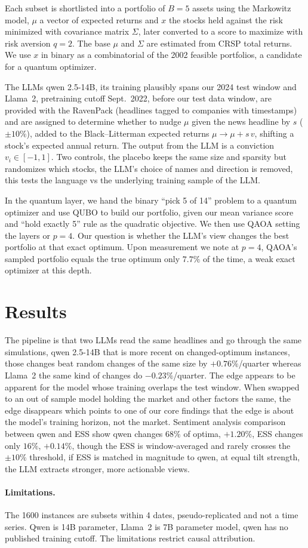 \documentclass[runningheads]{llncs}
\begin{document}
Each subset is shortlisted into a portfolio of $B=5$ assets using the Markowitz
model, $\mu$ a vector of expected returns and $x$ the stocks held against the risk minimized with covariance matrix $\Sigma$, later converted to a
score to maximize with risk aversion $q=2$. The base $\mu$ and $\Sigma$ are estimated from CRSP total returns. We use $x$ in binary as a combinatorial of the 2002 feasible portfolios, a candidate for a quantum optimizer.

The LLMs qwen 2.5-14B, its training plausibly spans our 2024 test window and Llama~2, pretraining cutoff Sept.\ 2022, before our test data window, are provided with the RavenPack (headlines tagged to companies with timestamps) and are assigned to determine whether to nudge $\mu$ given the news headline by $s$ ($\pm10\%$), added to the Black--Litterman expected returns $\mu \to \mu + s\,v$, shifting a stock's expected annual return. The output from the LLM is a conviction $v_i \in [-1,1]$. Two controls, the placebo keeps the same size and sparsity but randomizes which stocks, the LLM's choice of names and direction is removed, this tests the language vs the underlying training sample of the LLM.

In the quantum layer, we hand the binary ``pick 5 of 14'' problem to a quantum optimizer and use QUBO to build our portfolio, given our mean variance score and ``hold exactly 5'' rule as the quadratic objective. We then use QAOA setting the layers or $p=4$. Our question is whether the LLM's view changes the best portfolio at that exact optimum.
Upon measurement we note at $p=4$, QAOA's sampled portfolio
equals the true optimum only $7.7\%$ of the time, a weak exact optimizer at this depth.

\section{Results}
The pipeline is that two LLMs read the same headlines and go through the same simulations, qwen 2.5-14B that is more recent on
changed-optimum instances, those changes beat random changes of the same size by $+0.76\%$/quarter whereas
Llama~2 the same kind of changes do $-0.23\%$/quarter. The edge appears to be
apparent for the model whose training overlaps the test window. When swapped to an out of sample model
holding the market and other factors the same, the edge disappears which points to one of our core
findings that the edge is about the model's training horizon, not the market.
Sentiment analysis comparison between qwen and ESS show qwen changes $68\%$ of optima, $+1.20\%$, ESS
changes only $16\%$, $+0.14\%$, though the ESS is window-averaged and rarely crosses the $\pm10\%$ threshold, if ESS is matched in magnitude to qwen, at equal tilt strength, the LLM extracts stronger, more actionable views.
\paragraph{Limitations.} The 1600 instances are subsets within 4 dates, pseudo-replicated and not a time series. Qwen is 14B parameter, Llama~2 is 7B parameter model, qwen has no published training cutoff. The limitations restrict causal attribution.



\end{document}
